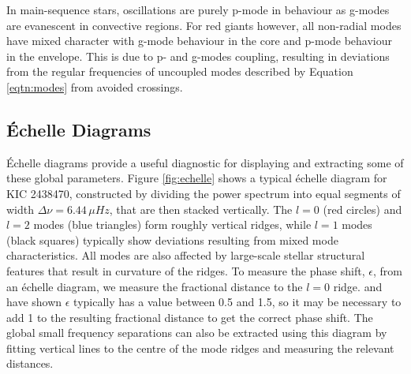 In main-sequence stars, oscillations are purely p-mode in behaviour as g-modes are evanescent in convective regions. For red giants however, all non-radial modes have mixed character with g-mode behaviour in the core and p-mode behaviour in the envelope. This is due to p- and g-modes coupling, resulting in deviations from the regular frequencies of uncoupled modes described by Equation \ref{eqtn:modes} from avoided crossings.

\subsection*{\'Echelle Diagrams}
\label{sect:ech}
\'Echelle diagrams \citep{grec_full-disk_1983} provide a useful diagnostic for displaying and extracting some of these global parameters. Figure \ref{fig:echelle} shows a typical \'echelle diagram for KIC 2438470, constructed by dividing the power spectrum into equal segments of width $\Delta\nu = 6.44\,\mu Hz$, that are then stacked vertically. The $l = 0$ (red circles) and $l = 2$ modes (blue triangles) form roughly vertical ridges, while $l = 1$ modes (black squares) typically show deviations resulting from mixed mode characteristics. All modes are also affected by large-scale stellar structural features that result in curvature of the ridges. To measure the phase shift, $\epsilon$, from an \'echelle diagram, we measure the fractional distance to the $l = 0$ ridge. \cite{huber_asteroseismology_2010} and \cite{white_asteroseismic_2011} have shown $\epsilon$ typically has a value between 0.5 and 1.5, so it may be necessary to add 1 to the resulting fractional distance to get the correct phase shift. The global small frequency separations can also be extracted using this diagram by fitting vertical lines to the centre of the mode ridges and measuring the relevant distances.

